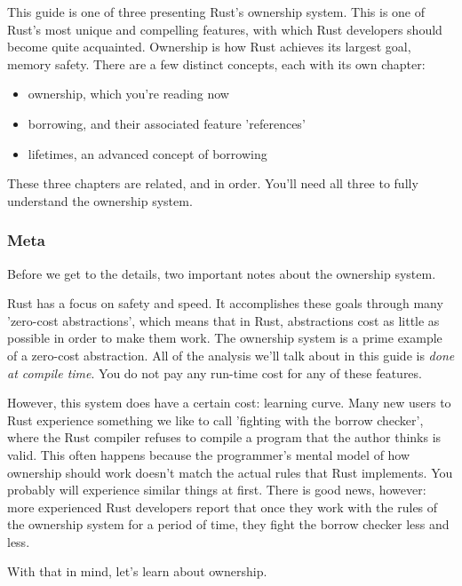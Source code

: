 This guide is one of three presenting Rust's ownership system. This is one of Rust's most unique and compelling features, with 
which Rust developers should become quite acquainted. Ownership is how Rust achieves its largest goal, memory safety. There are 
a few distinct concepts, each with its own chapter:

\begin{itemize}
  \item{ownership, which you're reading now}
  \item{borrowing, and their associated feature 'references'}
  \item{lifetimes, an advanced concept of borrowing}
\end{itemize}

These three chapters are related, and in order. You'll need all three to fully understand the ownership system.

\subsubsection*{Meta}

Before we get to the details, two important notes about the ownership system.

\blank

Rust has a focus on safety and speed. It accomplishes these goals through many 'zero-cost abstractions', which means that in 
Rust, abstractions cost as little as possible in order to make them work. The ownership system is a prime example of a zero-cost
abstraction. All of the analysis we'll talk about in this guide is \emph{done at compile time}. You do not pay any run-time cost 
for any of these features.

\blank

However, this system does have a certain cost: learning curve. Many new users to Rust experience something we like to call 
'fighting with the borrow checker', where the Rust compiler refuses to compile a program that the author thinks is valid. 
This often happens because the programmer's mental model of how ownership should work doesn't match the actual rules that Rust 
implements. You probably will experience similar things at first. There is good news, however: more experienced Rust developers 
report that once they work with the rules of the ownership system for a period of time, they fight the borrow checker less and less.

\blank

With that in mind, let's learn about ownership.

